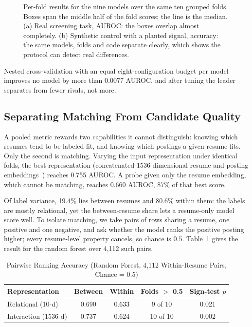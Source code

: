 \documentclass[conference,a4paper]{IEEEtran}
\begin{document}
\begin{figure}[t]
\centering

\caption{Per-fold results for the nine models over the same ten grouped folds.
Boxes span the middle half of the fold scores; the line is the median. (a) Real
screening task, AUROC: the boxes overlap almost completely. (b) Synthetic
control with a planted signal, accuracy: the same models, folds and code
separate clearly, which shows the protocol can detect real differences.}
\label{fig:folds}
\end{figure}

Nested cross-validation with an equal eight-configuration budget per model
improves no model by more than 0.0077 AUROC, and after tuning the leader
separates from fewer rivals, not more.

\subsection{Separating Matching From Candidate Quality}
\label{sec:within}
A pooled metric rewards two capabilities it cannot distinguish: knowing which
resumes tend to be labeled fit, and knowing which postings a given
resume fits. Only the second is matching. Varying the input representation
under identical folds, the best representation (concatenated 1536-dimensional
resume and posting embeddings~\cite{nussbaum2024}) reaches 0.755 AUROC. A
probe given only the resume embedding, which cannot be matching, reaches
0.660 AUROC, 87\% of that best score.

Of label variance, 19.4\% lies between resumes and 80.6\% within them: the
labels are mostly relational, yet the between-resume share lets a resume-only
model score well. To isolate matching, we take pairs of rows sharing a resume,
one positive and one negative, and ask whether the model ranks the positive
posting higher; every resume-level property cancels, so chance is 0.5. Table~\ref{tab:within} gives the result for the random forest over 4,112
such pairs.

\begin{table}[t]
\caption{Pairwise Ranking Accuracy (Random Forest, 4,112 Within-Resume
Pairs, Chance = 0.5)}
\label{tab:within}
\centering
\footnotesize
\setlength{\tabcolsep}{4pt}
\begin{tabular}{@{}lcccc@{}}
\toprule
Representation & Between & Within & Folds $>$ 0.5 & Sign-test $p$ \\
\midrule
Relational (10-d)     & 0.690 & 0.633 & 9 of 10  & 0.021 \\
Interaction (1536-d)  & 0.737 & 0.624 & 10 of 10 & 0.002 \\
\bottomrule
\end{tabular}
\end{table}
\end{document}
